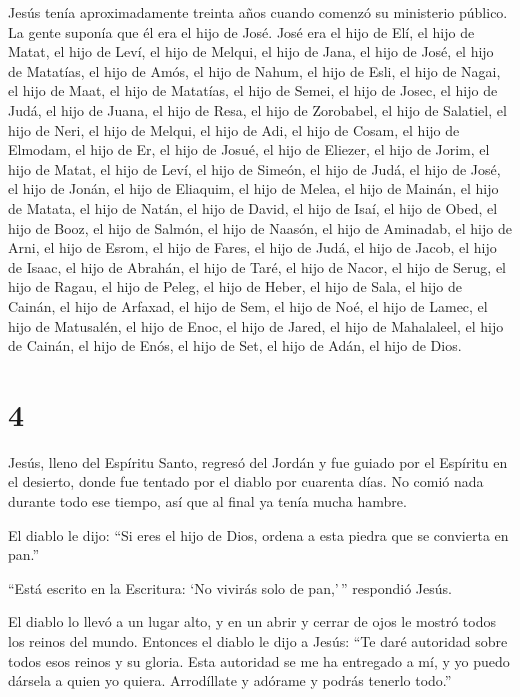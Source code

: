 Jesús tenía aproximadamente treinta años cuando comenzó su
ministerio público. La gente suponía que él era el hijo de José. José
era el hijo de Elí,  el hijo de Matat, el hijo de Leví, el
hijo de Melqui, el hijo de Jana, el hijo de José,  el hijo
de Matatías, el hijo de Amós, el hijo de Nahum, el hijo de Esli, el hijo
de Nagai,  el hijo de Maat, el hijo de Matatías, el hijo de
Semei, el hijo de Josec, el hijo de Judá,  el hijo de
Juana, el hijo de Resa, el hijo de Zorobabel, el hijo de Salatiel, el
hijo de Neri,  el hijo de Melqui, el hijo de Adi, el hijo
de Cosam, el hijo de Elmodam, el hijo de Er,  el hijo de
Josué, el hijo de Eliezer, el hijo de Jorim, el hijo de Matat, el hijo
de Leví,  el hijo de Simeón, el hijo de Judá, el hijo de
José, el hijo de Jonán, el hijo de Eliaquim,  el hijo de
Melea, el hijo de Mainán, el hijo de Matata, el hijo de Natán, el hijo
de David,  el hijo de Isaí, el hijo de Obed, el hijo de
Booz, el hijo de Salmón, el hijo de Naasón,  el hijo de
Aminadab, el hijo de Arni, el hijo de Esrom, el hijo de Fares, el hijo
de Judá,  el hijo de Jacob, el hijo de Isaac, el hijo de
Abrahán, el hijo de Taré, el hijo de Nacor,  el hijo de
Serug, el hijo de Ragau, el hijo de Peleg, el hijo de Heber, el hijo de
Sala,  el hijo de Cainán, el hijo de Arfaxad, el hijo de
Sem, el hijo de Noé, el hijo de Lamec,  el hijo de
Matusalén, el hijo de Enoc, el hijo de Jared, el hijo de Mahalaleel, el
hijo de Cainán,  el hijo de Enós, el hijo de Set, el hijo
de Adán, el hijo de Dios.

\hypertarget{section-3}{%
\section{4}\label{section-3}}

 Jesús, lleno del Espíritu Santo, regresó del Jordán y fue
guiado por el Espíritu en el desierto,  donde fue tentado
por el diablo por cuarenta días. No comió nada durante todo ese tiempo,
así que al final ya tenía mucha hambre.

 El diablo le dijo: ``Si eres el hijo de Dios, ordena a esta
piedra que se convierta en pan.''

 ``Está escrito en la Escritura: `No vivirás solo de
pan,'\,'' respondió Jesús.

 El diablo lo llevó a un lugar alto, y en un abrir y cerrar
de ojos le mostró todos los reinos del mundo.  Entonces el
diablo le dijo a Jesús: ``Te daré autoridad sobre todos esos reinos y su
gloria. Esta autoridad se me ha entregado a mí, y yo puedo dársela a
quien yo quiera.  Arrodíllate y adórame y podrás tenerlo
todo.''


